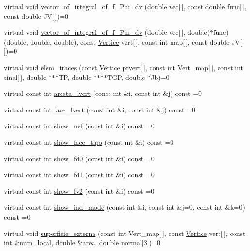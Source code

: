 \begin{DoxyCompactItemize}
\item 
virtual void \hyperlink{classStdel_aa5ef347c02106753c2d3961b59a7309e}{vector\+\_\+of\+\_\+integral\+\_\+of\+\_\+f\+\_\+\+Phi\+\_\+dv} (double vec\mbox{[}$\,$\mbox{]}, const double func\mbox{[}$\,$\mbox{]}, const double JV\mbox{[}$\,$\mbox{]})=0
\item 
virtual void \hyperlink{classStdel_a3a22725f255ab04520ce1744eef8e2c0}{vector\+\_\+of\+\_\+integral\+\_\+of\+\_\+f\+\_\+\+Phi\+\_\+dv} (double vec\mbox{[}$\,$\mbox{]}, double($\ast$func)(double, double, double), const \hyperlink{structVertice}{Vertice} vert\mbox{[}$\,$\mbox{]}, const int map\mbox{[}$\,$\mbox{]}, const double JV\mbox{[}$\,$\mbox{]})=0
\item 
virtual void \hyperlink{classStdel_a3d72869352a2ff5eeb23972eca3b391e}{elem\+\_\+traces} (const \hyperlink{structVertice}{Vertice} ptvert\mbox{[}$\,$\mbox{]}, const int Vert\+\_\+map\mbox{[}$\,$\mbox{]}, const int sinal\mbox{[}$\,$\mbox{]}, double $\ast$$\ast$$\ast$TP, double $\ast$$\ast$$\ast$$\ast$T\+GP, double $\ast$Jb)=0
\item 
virtual const int \hyperlink{classStdel_a69b8ef7def7891fcb2d5d8fd9b75bdc8}{aresta\+\_\+lvert} (const int \&i, const int \&j) const =0
\item 
virtual const int \hyperlink{classStdel_a0df3b2fe6d87c6d0067d07ac2a2d3a32}{face\+\_\+lvert} (const int \&i, const int \&j) const =0
\item 
virtual const int \hyperlink{classStdel_a2a504322269a749dd3c443d0e86c4a6c}{show\+\_\+nvf} (const int \&i) const =0
\item 
virtual const int \hyperlink{classStdel_ae76b0893dabd93ae9f86a9ed445852ba}{show\+\_\+face\+\_\+tipo} (const int \&i) const =0
\item 
virtual const int \hyperlink{classStdel_a0e05ccae64925915af5f07c91d61c7bc}{show\+\_\+fd0} (const int \&i) const =0
\item 
virtual const int \hyperlink{classStdel_af4a394fae421489159f40ddcb736353b}{show\+\_\+fd1} (const int \&i) const =0
\item 
virtual const int \hyperlink{classStdel_a67f16a65f02fc8a5aa10274539bd1ad8}{show\+\_\+fv2} (const int \&i) const =0
\item 
virtual const int \hyperlink{classStdel_aa97cf7534697be1f2e02ff540ed7433b}{show\+\_\+ind\+\_\+mode} (const int \&i, const int \&j=0, const int \&k=0) const =0
\item 
virtual void \hyperlink{classStdel_a4e4aa3bbd0299054ec5447bd73efc6a0}{superficie\+\_\+externa} (const int Vert\+\_\+map\mbox{[}$\,$\mbox{]}, const \hyperlink{structVertice}{Vertice} vert\mbox{[}$\,$\mbox{]}, const int \&num\+\_\+local, double \&area, double normal\mbox{[}3\mbox{]})=0
\end{DoxyCompactItemize}
